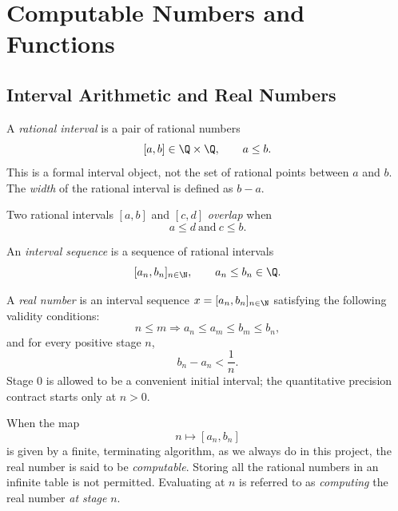 \chapter{Computable Numbers and Functions}

\section{Interval Arithmetic and Real Numbers \humanchecked}

\begin{definition}\label{def:qinterval}
A \emph{rational interval} is a pair of rational numbers
\[
  [a,b]\in\Q\times\Q,\qquad a\le b.
\]
This is a formal interval object, not the set of rational points between
\(a\) and \(b\).  The \emph{width} of the rational interval is defined as \(b-a\).

Two rational intervals \([a, b]\) and \([c, d]\) \emph{overlap} when
\[
  a\le d\ \text{and}\ c\le b.
\]
\end{definition}

\begin{definition}\label{def:interval-sequence}
An \emph{interval sequence} is a sequence of rational intervals
\[
  [a_n,b_n]_{n\in\N},
  \qquad a_n \leq b_n\in\Q.
\]
\end{definition}

\begin{definition}\label{def:raw-real}
A \emph{real number} is an interval sequence \(x=[a_n,b_n]_{n\in\N}\) satisfying the
following validity conditions:
\[
  n\le m\Rightarrow
  a_n\le a_m\le b_m\le b_n,
\]
and for every positive stage \(n\),
\[
  b_n-a_n < \frac{1}{n}.
\]
Stage \(0\) is allowed to be a convenient initial interval; the quantitative
precision contract starts only at \(n>0\).
\end{definition}

\begin{remark}\label{rem:computable-presentations}
When the map 
\[
  n\mapsto [a_n,b_n]
\]
is given by a finite, terminating algorithm, as we always do in this project,
the real number is said to be \emph{computable}. Storing all the rational numbers
in an infinite table is not permitted. Evaluating at \(n\) is referred to as
\emph{computing} the real number \emph{at stage} \(n\).
\end{remark}

